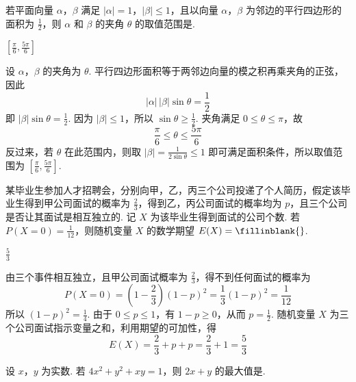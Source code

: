 \begin{problem}
若平面向量 \(\alpha\)，\(\beta\) 满足 \(|\alpha| = 1\)，\(|\beta| \leqslant 1\)，且以向量 \(\alpha\)，\(\beta\) 为邻边的平行四边形的面积为 \(\frac{1}{2}\)，则 \(\alpha\) 和 \(\beta\) 的夹角 \(\theta\) 的取值范围是\fillinblank{}.
\end{problem}

\begin{answer}
\(\left[\frac{\pi}{6},\frac{5\pi}{6}\right]\)
\end{answer}

\begin{solution}
设 \(\alpha\)，\(\beta\) 的夹角为 \(\theta\). 平行四边形面积等于两邻边向量的模之积再乘夹角的正弦，因此
\[
|\alpha|\,|\beta|\sin\theta=\frac{1}{2}
\]
即 \(|\beta|\sin\theta=\frac{1}{2}\). 因为 \(|\beta|\leqslant 1\)，所以 \(\sin\theta\geqslant\frac{1}{2}\). 夹角满足 \(0\leqslant\theta\leqslant\pi\)，故
\[
\frac{\pi}{6}\leqslant\theta\leqslant\frac{5\pi}{6}
\]
反过来，若 \(\theta\) 在此范围内，则取 \(|\beta|=\frac{1}{2\sin\theta}\leqslant 1\) 即可满足面积条件，所以取值范围为 \(\left[\frac{\pi}{6},\frac{5\pi}{6}\right]\).
\end{solution}

\begin{problem}
某毕业生参加人才招聘会，分别向甲，乙，丙三个公司投递了个人简历，假定该毕业生得到甲公司面试的概率为 \(\frac{2}{3}\)，得到乙，丙公司面试的概率均为 \(p\)，且三个公司是否让其面试是相互独立的. 记 \(X\) 为该毕业生得到面试的公司个数. 若 \(P(X = 0) = \frac{1}{12}\)，则随机变量 \(X\) 的数学期望 \(E(X) =\fillinblank{}\).
\end{problem}

\begin{answer}
\(\frac{5}{3}\)
\end{answer}

\begin{solution}
由三个事件相互独立，且甲公司面试概率为 \(\frac{2}{3}\)，得不到任何面试的概率为
\[
P(X=0)=\left(1-\frac{2}{3}\right)(1-p)^2=\frac{1}{3}(1-p)^2=\frac{1}{12}
\]
所以 \((1-p)^2=\frac{1}{4}\). 由于 \(0\leqslant p\leqslant 1\)，有 \(1-p\geqslant 0\)，从而 \(p=\frac{1}{2}\). 随机变量 \(X\) 为三个公司面试指示变量之和，利用期望的可加性，得
\[
E(X)=\frac{2}{3}+p+p=\frac{2}{3}+1=\frac{5}{3}
\]
\end{solution}

\begin{problem}
设 \(x\)，\(y\) 为实数. 若 \(4x^{2} + y^{2} + xy = 1\)，则 \(2x + y\) 的最大值是\fillinblank{}.
\end{problem}

